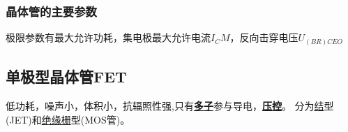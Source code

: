 \subsubsection{晶体管的主要参数}
极限参数有最大允许功耗，集电极最大允许电流$I_CM$，反向击穿电压$U_{(BR)CEO}$

\subsection{单极型晶体管FET}
低功耗，噪声小，体积小，抗辐照性强,只有\textbf{\underline{多子}}参与导电，\underline{\textbf{压控}}。
分为\underline{结}型(JET)和\underline{绝缘栅}型(MOS管)。
